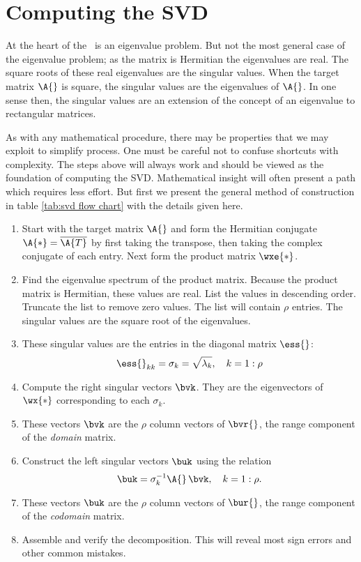 \section{Computing the SVD}
At the heart of the \asvd \ is an eigenvalue problem. But not the most general case of the eigenvalue problem; as the matrix is Hermitian the eigenvalues are real. The square roots of these real eigenvalues are the singular values. When the target matrix $\A{}$ is square, the singular values are the eigenvalues of $\A{}$. In one sense then, the singular values are an extension of the concept of an eigenvalue to rectangular matrices.

As with any mathematical procedure, there may be properties that we may exploit to simplify process. One must be careful not to confuse shortcuts with complexity. The steps above will always work and should be viewed as the foundation of computing the SVD. Mathematical insight will often present a path which requires less effort. But first we present the general method of construction in table \eqref{tab:svd flow chart} with the details given here.
\begin{enumerate}
%
  \item Start with the target matrix $\A{}$ and form the Hermitian conjugate $\A{*} = \overline{\A{T}}$ by first taking the transpose, then taking the complex conjugate of each entry. Next form the product matrix $\wxe{*}$.
%
  \item Find the eigenvalue spectrum of the product matrix. Because the product matrix is Hermitian, these values are real. List the values in descending order. Truncate the list to remove zero values. The list will contain $\rho$ entries. The singular values are the square root of the eigenvalues.
%
  \item These singular values are the entries in the diagonal matrix $\ess{}$:
\begin{equation}
  \ess{}_{kk} = \sigma_{k} = \sqrt{\lambda_{k}}, \quad k = 1:\rho
\end{equation}
%
  \item Compute the right singular vectors $\bvk$. They are the eigenvectors of $\wx{*}$ corresponding to each $\sigma_{k}$.
%
  \item These vectors $\bvk$ are the $\rho$ column vectors of $\bvr{}$, the range component of the \emph{domain} matrix.
%
  \item Construct the left singular vectors $\buk$ using the relation
\begin{equation}
  \buk = \sigma_{k}^{-1} \A{}\, \bvk, \quad k = 1:\rho.
\end{equation}
%
  \item These vectors $\buk$ are the $\rho$ column vectors of $\bur{}$, the range component of the \emph{codomain} matrix.
%
  \item Assemble and verify the decomposition. This will reveal most sign errors and other common mistakes.
%
\end{enumerate}
